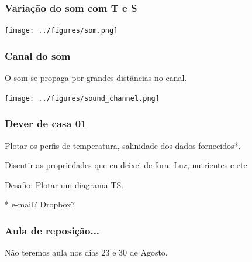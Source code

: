 \begin{frame}
\frametitle{Variação do som com T e S}
    \begin{center}
        \texttt{[image: ../figures/som.png]}
    \end{center}
\end{frame}


\begin{frame}
\frametitle{Canal do som}
  \begin{block}{}
    O som se propaga por grandes distâncias no canal.
  \end{block}

    \begin{center}
        \texttt{[image: ../figures/sound\_channel.png]}
    \end{center}
\end{frame}


\begin{frame}
\frametitle{Dever de casa 01}
  \begin{block}{}
    Plotar os perfis de temperatura, salinidade dos dados fornecidos*.

    Discutir as propriedades que eu deixei de fora: Luz, nutrientes e etc

    Desafio: Plotar um diagrama TS.
    \end{block}

    \pause
    \begin{block}{}
        * e-mail? Dropbox?
    \end{block}
\end{frame}


\begin{frame}
\frametitle{Aula de reposição...}
  \begin{block}{}
    Não teremos aula nos dias 23 e 30 de Agosto.
  \end{block}
\end{frame}


